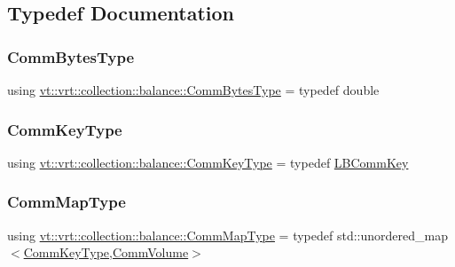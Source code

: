 \subsection{Typedef Documentation}
\mbox{\label{namespacevt_1_1vrt_1_1collection_1_1balance_a0772d7dd137393e9874b9f8caa96d420}} 
\subsubsection{\texorpdfstring{Comm\+Bytes\+Type}{CommBytesType}}
{\footnotesize\ttfamily using \hyperlink{namespacevt_1_1vrt_1_1collection_1_1balance_a0772d7dd137393e9874b9f8caa96d420}{vt\+::vrt\+::collection\+::balance\+::\+Comm\+Bytes\+Type} = typedef double}

\mbox{\label{namespacevt_1_1vrt_1_1collection_1_1balance_a01c9a1060d83d052604a3ff12918033a}} 
\subsubsection{\texorpdfstring{Comm\+Key\+Type}{CommKeyType}}
{\footnotesize\ttfamily using \hyperlink{namespacevt_1_1vrt_1_1collection_1_1balance_a01c9a1060d83d052604a3ff12918033a}{vt\+::vrt\+::collection\+::balance\+::\+Comm\+Key\+Type} = typedef \hyperlink{structvt_1_1vrt_1_1collection_1_1balance_1_1_l_b_comm_key}{L\+B\+Comm\+Key}}

\mbox{\label{namespacevt_1_1vrt_1_1collection_1_1balance_a10860c956804d644db54a16012352728}} 
\subsubsection{\texorpdfstring{Comm\+Map\+Type}{CommMapType}}
{\footnotesize\ttfamily using \hyperlink{namespacevt_1_1vrt_1_1collection_1_1balance_a10860c956804d644db54a16012352728}{vt\+::vrt\+::collection\+::balance\+::\+Comm\+Map\+Type} = typedef std\+::unordered\+\_\+map$<$\hyperlink{namespacevt_1_1vrt_1_1collection_1_1balance_a01c9a1060d83d052604a3ff12918033a}{Comm\+Key\+Type},\hyperlink{structvt_1_1vrt_1_1collection_1_1balance_1_1_comm_volume}{Comm\+Volume}$>$}

